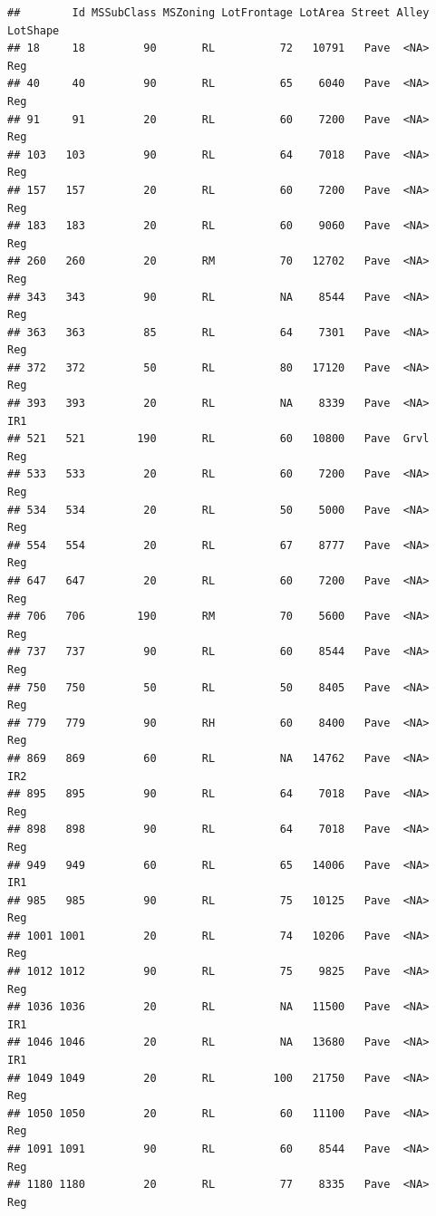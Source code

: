 \documentclass[]{article}
\begin{document}
\begin{verbatim}
##        Id MSSubClass MSZoning LotFrontage LotArea Street Alley LotShape
## 18     18         90       RL          72   10791   Pave  <NA>      Reg
## 40     40         90       RL          65    6040   Pave  <NA>      Reg
## 91     91         20       RL          60    7200   Pave  <NA>      Reg
## 103   103         90       RL          64    7018   Pave  <NA>      Reg
## 157   157         20       RL          60    7200   Pave  <NA>      Reg
## 183   183         20       RL          60    9060   Pave  <NA>      Reg
## 260   260         20       RM          70   12702   Pave  <NA>      Reg
## 343   343         90       RL          NA    8544   Pave  <NA>      Reg
## 363   363         85       RL          64    7301   Pave  <NA>      Reg
## 372   372         50       RL          80   17120   Pave  <NA>      Reg
## 393   393         20       RL          NA    8339   Pave  <NA>      IR1
## 521   521        190       RL          60   10800   Pave  Grvl      Reg
## 533   533         20       RL          60    7200   Pave  <NA>      Reg
## 534   534         20       RL          50    5000   Pave  <NA>      Reg
## 554   554         20       RL          67    8777   Pave  <NA>      Reg
## 647   647         20       RL          60    7200   Pave  <NA>      Reg
## 706   706        190       RM          70    5600   Pave  <NA>      Reg
## 737   737         90       RL          60    8544   Pave  <NA>      Reg
## 750   750         50       RL          50    8405   Pave  <NA>      Reg
## 779   779         90       RH          60    8400   Pave  <NA>      Reg
## 869   869         60       RL          NA   14762   Pave  <NA>      IR2
## 895   895         90       RL          64    7018   Pave  <NA>      Reg
## 898   898         90       RL          64    7018   Pave  <NA>      Reg
## 949   949         60       RL          65   14006   Pave  <NA>      IR1
## 985   985         90       RL          75   10125   Pave  <NA>      Reg
## 1001 1001         20       RL          74   10206   Pave  <NA>      Reg
## 1012 1012         90       RL          75    9825   Pave  <NA>      Reg
## 1036 1036         20       RL          NA   11500   Pave  <NA>      IR1
## 1046 1046         20       RL          NA   13680   Pave  <NA>      IR1
## 1049 1049         20       RL         100   21750   Pave  <NA>      Reg
## 1050 1050         20       RL          60   11100   Pave  <NA>      Reg
## 1091 1091         90       RL          60    8544   Pave  <NA>      Reg
## 1180 1180         20       RL          77    8335   Pave  <NA>      Reg

\end{verbatim}
\end{document}
